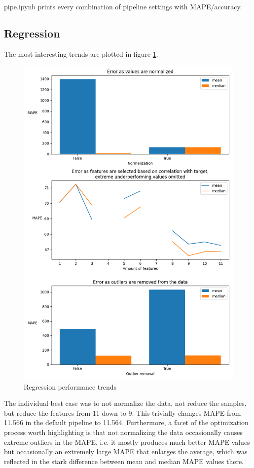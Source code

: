 \documentclass[12pt, letterpaper]{article}
\begin{document}
pipe.ipynb prints every combination of pipeline settings with MAPE/accuracy.

\subsection{Regression}\label{reg_results}

The most interesting trends are plotted in figure \ref{reg_plt}.

\begin{figure}[H]
    \centering
    \includegraphics[scale=0.7]{regression_performance.png}
    \caption{Regression performance trends}
    \label{reg_plt} %
\end{figure}

The individual best case was to not normalize the data, not reduce the samples, but reduce the features from 11 down to 9. This trivially changes MAPE from 11.566 in the default pipeline to 11.564. Furthermore, a facet of the optimization process worth highlighting is that not normalizing the data occasionally causes extreme outliers in the MAPE, i.e. it mostly produces much better MAPE values but occasionally an extremely large MAPE that enlarges the average, which was reflected in the stark difference between mean and median MAPE values there.
\end{document}
